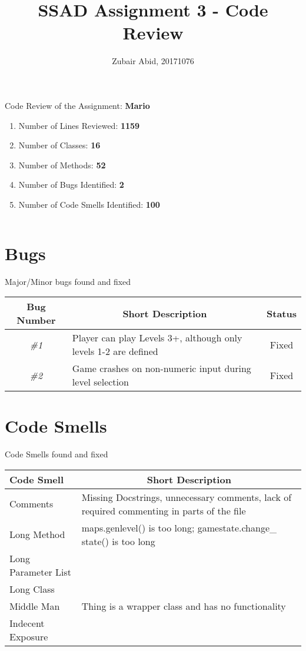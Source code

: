\documentclass[11pt,a4paper]{article}
\title{SSAD Assignment 3 - Code Review}
\author{Zubair Abid, 20171076}
\date{}
\begin{document}
	\maketitle
	Code Review of the Assignment: \textbf{Mario}\\
    \begin{enumerate}
    	\item Number of Lines Reviewed: \textbf{1159}
    	
    	\item Number of Classes: \textbf{16}
    	
    	\item Number of Methods: \textbf{52}
    	
    	\item Number of Bugs Identified: \textbf{2}
    	
    	\item Number of Code Smells Identified: \textbf{100}
    \end{enumerate}
	$ $\\
	
	\section{Bugs}	
	Major/Minor bugs found and fixed	

	\begin{table}[H]
		\centering
		\begin{tabular}{@{}clc@{}}
			\toprule
			\textbf{Bug Number} & \multicolumn{1}{c}{\textbf{Short Description}} & \textbf{Status} \\ \midrule
			\textit{\#1} & Player can play Levels 3+,  although only levels 1-2 are defined & Fixed \\
			\textit{\#2} & Game crashes on non-numeric input during level selection & Fixed \\ \bottomrule
		\end{tabular}
	\end{table}

	\section{Code Smells}
	Code Smells found and fixed	
		
	\begin{table}[H]
		\centering
		\begin{tabular}{p{4cm}p{11cm}}
			\toprule
			\textbf{Code Smell} & \multicolumn{1}{c}{\textbf{Short Description}}\\ \midrule
			Comments & Missing Docstrings, unnecessary comments, lack of required commenting in
						parts of the file \\
			Long Method & maps.genlevel() is too long; gamestate.change\_ state() is too long \\ 
			Long Parameter List &  \\ 
			Long Class & \\ 
			Middle Man & Thing is a wrapper class and has no functionality \\ 
			Indecent Exposure & \\ \bottomrule
		\end{tabular}
	\end{table}
	
\end{document}

